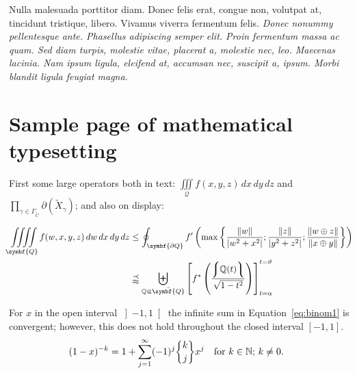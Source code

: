 Nulla malesuada porttitor diam. Donec felis erat, congue non, volutpat at, tincidunt tristique, libero. Vivamus viverra fermentum felis. \textit{Donec nonummy pellentesque ante. Phasellus adipiscing semper elit. Proin fermentum massa ac quam. Sed diam turpis, molestie vitae, placerat a, molestie nec, leo. Maecenas lacinia. Nam ipsum ligula, eleifend at, accumsan nec, suscipit a, ipsum. Morbi blandit ligula feugiat magna.}



\newpage


\section{Sample page of mathematical typesetting}

First some large operators
both in text: \( \iiint\limits_{\mathcal{Q}}
f(x,y,z)\,dx\,dy\,dz \) and
\(\prod_{\gamma\in\Gamma_{\widetilde{C}}}
\partial(\widetilde{X}_\gamma)\); and also on display:

\begin{equation}
\begin{split}
\iiiint\limits_{\symbf{Q}} f(w,x,y,z)\,dw\,dx\,dy\,dz  &\leq
\oint_{\symbf{\partial Q}} f' \left( \max \left\lbrace
\frac{\lVert w \rVert}{\lvert w^2 + x^2 \rvert} ;
\frac{\lVert z \rVert}{\lvert y^2 + z^2 \rvert} ;
\frac{\lVert w \oplus z \rVert}{\lVert x \oplus y \rVert}
\right\rbrace\right)
\\
&\precapprox \biguplus_{\mathbb{Q} \Subset \bar{\symbf{Q}}}
\left[ f^{\ast} \left(
    \frac{\left\lmoustache\mathbb{Q}(t)\right\rmoustache}
         {\sqrt {1 - t^2}}
    \right)\right]_{t=\alpha}^{t=\vartheta}
\end{split}
\end{equation}

For $x$ in the open interval \( \left] -1, 1 \right[ \)
the infinite sum in Equation~\eqref{eq:binom1} is convergent;
however, this does not hold
throughout the closed interval \( \left[ -1, 1 \right] \).
\begin{align}
  (1 - x)^{-k} &=
    1 + \sum_{j=1}^{\infty} (-1)^j \genfrac\lbrace\rbrace{0pt}{}{k}{j} x^j
    \text{\quad for $k \in \mathbb{N}$; $k \neq 0$.}
    \label{eq:binom1}
\end{align}


